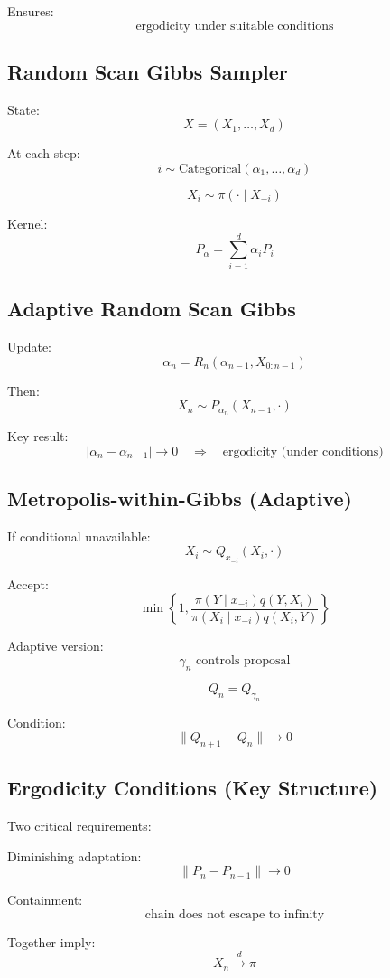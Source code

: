 \documentclass[12pt,oneside]{book}
\numberwithin{equation}{section}
\theoremstyle{definition}
\theoremstyle{plain}
\theoremstyle{remark}
\begin{document}
Ensures:
\[
\text{ergodicity under suitable conditions}
\]

\subsection{Random Scan Gibbs Sampler}

State:
\[
X = (X_1, \dots, X_d)
\]

At each step:
\[
i \sim \text{Categorical}(\alpha_1,\dots,\alpha_d)
\]

\[
X_i \sim \pi(\cdot \mid X_{-i})
\]

Kernel:
\[
P_\alpha = \sum_{i=1}^d \alpha_i P_i
\]

\subsection*{Adaptive Random Scan Gibbs}

Update:
\[
\alpha_n = R_n(\alpha_{n-1}, X_{0:n-1})
\]

Then:
\[
X_n \sim P_{\alpha_n}(X_{n-1}, \cdot)
\]

Key result:
\[
|\alpha_n - \alpha_{n-1}| \to 0
\quad \Rightarrow \quad \text{ergodicity (under conditions)}
\]

\subsection*{Metropolis-within-Gibbs (Adaptive)}

If conditional unavailable:
\[
X_i \sim Q_{x_{-i}}(X_i,\cdot)
\]

Accept:
\[
\min\left\{
1,
\frac{\pi(Y \mid x_{-i}) q(Y, X_i)}
{\pi(X_i \mid x_{-i}) q(X_i, Y)}
\right\}
\]

Adaptive version:
\[
\gamma_n \text{ controls proposal}
\]

\[
Q_{n} = Q_{\gamma_n}
\]

Condition:
\[
\|Q_{n+1} - Q_n\| \to 0
\]

\subsection*{Ergodicity Conditions (Key Structure)}

Two critical requirements:

Diminishing adaptation:
\[
\|P_n - P_{n-1}\| \to 0
\]

Containment:
\[
\text{chain does not escape to infinity}
\]

Together imply:
\[
X_n \xrightarrow{d} \pi
\]
\end{document}
